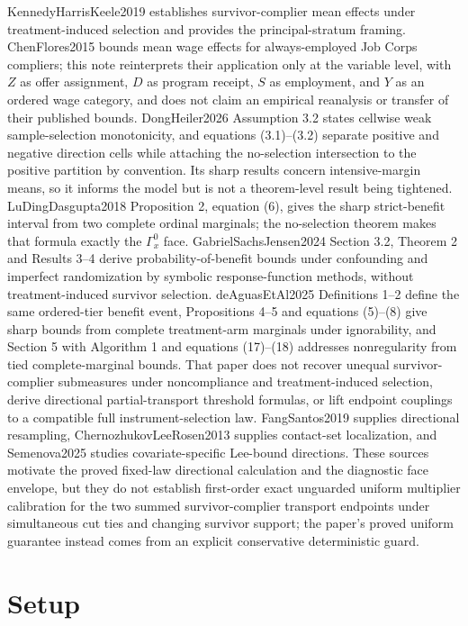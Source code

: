 \documentclass{article}
\begin{document}
KennedyHarrisKeele2019 establishes survivor-complier mean effects under treatment-induced selection and provides the principal-stratum framing. ChenFlores2015 bounds mean wage effects for always-employed Job Corps compliers; this note reinterprets their application only at the variable level, with \(Z\) as offer assignment, \(D\) as program receipt, \(S\) as employment, and \(Y\) as an ordered wage category, and does not claim an empirical reanalysis or transfer of their published bounds. DongHeiler2026 Assumption 3.2 states cellwise weak sample-selection monotonicity, and equations (3.1)--(3.2) separate positive and negative direction cells while attaching the no-selection intersection to the positive partition by convention. Its sharp results concern intensive-margin means, so it informs the model but is not a theorem-level result being tightened. LuDingDasgupta2018 Proposition 2, equation (6), gives the sharp strict-benefit interval from two complete ordinal marginals; the no-selection theorem makes that formula exactly the \(\Gamma_x^{0}\) face. GabrielSachsJensen2024 Section 3.2, Theorem 2 and Results 3--4 derive probability-of-benefit bounds under confounding and imperfect randomization by symbolic response-function methods, without treatment-induced survivor selection. deAguasEtAl2025 Definitions 1--2 define the same ordered-tier benefit event, Propositions 4--5 and equations (5)--(8) give sharp bounds from complete treatment-arm marginals under ignorability, and Section 5 with Algorithm 1 and equations (17)--(18) addresses nonregularity from tied complete-marginal bounds. That paper does not recover unequal survivor-complier submeasures under noncompliance and treatment-induced selection, derive directional partial-transport threshold formulas, or lift endpoint couplings to a compatible full instrument-selection law. FangSantos2019 supplies directional resampling, ChernozhukovLeeRosen2013 supplies contact-set localization, and Semenova2025 studies covariate-specific Lee-bound directions. These sources motivate the proved fixed-law directional calculation and the diagnostic face envelope, but they do not establish first-order exact unguarded uniform multiplier calibration for the two summed survivor-complier transport endpoints under simultaneous cut ties and changing survivor support; the paper's proved uniform guarantee instead comes from an explicit conservative deterministic guard.

\section{Setup}
\end{document}
